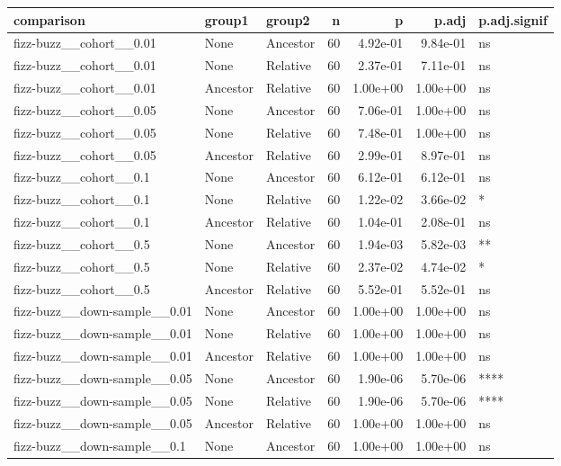 \documentclass[
]{book}
\begin{document}
\begin{tabular}{l|l|l|r|r|r|l}
\hline
comparison & group1 & group2 & n & p & p.adj & p.adj.signif\\
\hline
fizz-buzz\_\_cohort\_\_0.01 & None & Ancestor & 60 & 4.92e-01 & 9.84e-01 & ns\\
\hline
fizz-buzz\_\_cohort\_\_0.01 & None & Relative & 60 & 2.37e-01 & 7.11e-01 & ns\\
\hline
fizz-buzz\_\_cohort\_\_0.01 & Ancestor & Relative & 60 & 1.00e+00 & 1.00e+00 & ns\\
\hline
fizz-buzz\_\_cohort\_\_0.05 & None & Ancestor & 60 & 7.06e-01 & 1.00e+00 & ns\\
\hline
fizz-buzz\_\_cohort\_\_0.05 & None & Relative & 60 & 7.48e-01 & 1.00e+00 & ns\\
\hline
fizz-buzz\_\_cohort\_\_0.05 & Ancestor & Relative & 60 & 2.99e-01 & 8.97e-01 & ns\\
\hline
fizz-buzz\_\_cohort\_\_0.1 & None & Ancestor & 60 & 6.12e-01 & 6.12e-01 & ns\\
\hline
fizz-buzz\_\_cohort\_\_0.1 & None & Relative & 60 & 1.22e-02 & 3.66e-02 & *\\
\hline
fizz-buzz\_\_cohort\_\_0.1 & Ancestor & Relative & 60 & 1.04e-01 & 2.08e-01 & ns\\
\hline
fizz-buzz\_\_cohort\_\_0.5 & None & Ancestor & 60 & 1.94e-03 & 5.82e-03 & **\\
\hline
fizz-buzz\_\_cohort\_\_0.5 & None & Relative & 60 & 2.37e-02 & 4.74e-02 & *\\
\hline
fizz-buzz\_\_cohort\_\_0.5 & Ancestor & Relative & 60 & 5.52e-01 & 5.52e-01 & ns\\
\hline
fizz-buzz\_\_down-sample\_\_0.01 & None & Ancestor & 60 & 1.00e+00 & 1.00e+00 & ns\\
\hline
fizz-buzz\_\_down-sample\_\_0.01 & None & Relative & 60 & 1.00e+00 & 1.00e+00 & ns\\
\hline
fizz-buzz\_\_down-sample\_\_0.01 & Ancestor & Relative & 60 & 1.00e+00 & 1.00e+00 & ns\\
\hline
fizz-buzz\_\_down-sample\_\_0.05 & None & Ancestor & 60 & 1.90e-06 & 5.70e-06 & ****\\
\hline
fizz-buzz\_\_down-sample\_\_0.05 & None & Relative & 60 & 1.90e-06 & 5.70e-06 & ****\\
\hline
fizz-buzz\_\_down-sample\_\_0.05 & Ancestor & Relative & 60 & 1.00e+00 & 1.00e+00 & ns\\
\hline
fizz-buzz\_\_down-sample\_\_0.1 & None & Ancestor & 60 & 1.00e+00 & 1.00e+00 & ns\\

\end{tabular}
\end{document}
